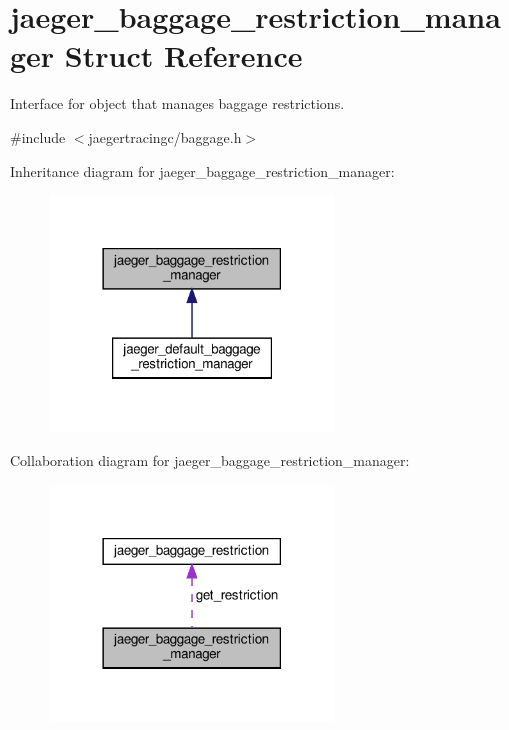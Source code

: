 \hypertarget{structjaeger__baggage__restriction__manager}{}\section{jaeger\+\_\+baggage\+\_\+restriction\+\_\+manager Struct Reference}
\label{structjaeger__baggage__restriction__manager}


Interface for object that manages baggage restrictions.  




{\ttfamily \#include $<$jaegertracingc/baggage.\+h$>$}



Inheritance diagram for jaeger\+\_\+baggage\+\_\+restriction\+\_\+manager\+:\nopagebreak
\begin{figure}[H]
\begin{center}
\leavevmode
\includegraphics[width=213pt]{structjaeger__baggage__restriction__manager__inherit__graph}
\end{center}
\end{figure}


Collaboration diagram for jaeger\+\_\+baggage\+\_\+restriction\+\_\+manager\+:\nopagebreak
\begin{figure}[H]
\begin{center}
\leavevmode
\includegraphics[width=213pt]{structjaeger__baggage__restriction__manager__coll__graph}
\end{center}
\end{figure}
